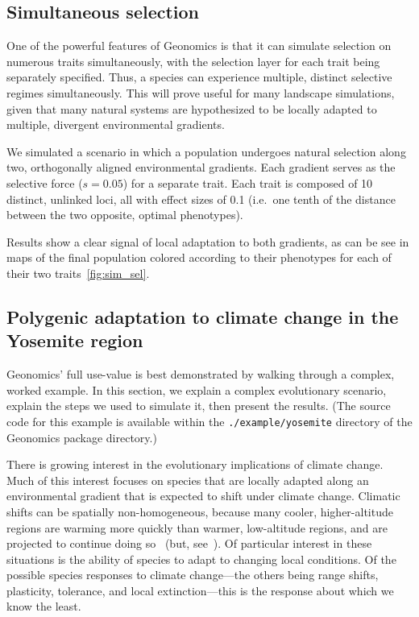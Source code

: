 ﻿\documentclass{article}
\begin{document}
\subsection{Simultaneous selection}
One of the powerful features of Geonomics is that it can simulate selection
on numerous traits simultaneously, with the selection layer for each trait
being separately specified. 
Thus, a species can experience multiple, distinct selective regimes simultaneously.
This will prove useful for many landscape simulations, given that many natural systems
are hypothesized to be locally adapted to multiple, divergent environmental gradients.

We simulated a scenario in which a population undergoes natural selection along two, orthogonally
aligned environmental gradients. Each gradient serves as the selective force ($s = 0.05$)
for a separate trait.
Each trait is composed of 10 distinct, unlinked loci, all with effect sizes of 0.1
(i.e.\ one tenth of the distance between the two opposite, optimal phenotypes).

Results show a clear signal of local adaptation to both gradients, as can be see in
maps of the final population colored according to their phenotypes for each of their
two traits~\ref{fig:sim_sel}.


\subsection{Polygenic adaptation to climate change in the Yosemite region}
Geonomics' full use-value is best demonstrated by walking through a complex, worked example.
In this section, we explain a complex evolutionary scenario, 
explain the steps we used to simulate it, then present the results.
(The source code for this example is available within the
\texttt{./example/yosemite} directory of the Geonomics package directory.)

There is growing interest in the evolutionary implications of climate change.
Much of this interest focuses on species that are locally adapted along an
environmental gradient that is expected to shift under climate change.
Climatic shifts can be spatially non-homogeneous, because many cooler,
higher-altitude regions are warming more quickly than warmer,
low-altitude regions, and are projected to continue doing
so~\cite{rangwala,mountain_research_initiative} (but, see~\cite{oyler}).
Of particular interest in these situations is the ability of species to adapt
to changing local conditions. Of the possible species responses to climate
change---the others being range shifts, plasticity, tolerance, and local
extinction---this is the response about which we know the least.
\end{document}

